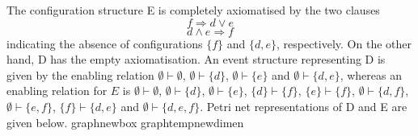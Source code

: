 \documentclass[twocolumn]{article}
\newcommand{\turn}{\vdash}                              \newcommand{\dbigcup}{\bigcup_{\uparrow}}		\newcommand{\nbigcup}{\bigcup_{\bullet}}		\newcommand{\nbigcap}{\bigcap_{\bullet}}		\newcommand{\bbigcup}{\overline{\bigcup}}		\newcommand{\bbigcap}{\overline{\bigcap}}		\newcommand{\nbbigcap}{\bbigcap_{\bullet}}		\newcommand{\fbbigcup}{\overline{\bigcup}^f}		\newcommand{\bbbigcup}{\overline{\bigcup}^2}		\newcommand{\dcup}{~~\makebox[0pt]{\LARGE$\cdot$}\makebox[0pt]{$\cup$}~~}
\begin{document}
The configuration structure E is completely axiomatised by the two
clauses $$f \Rightarrow d\vee e$$ \vspace{-2em} $$d\wedge e \Rightarrow f$$
indicating the absence of configurations $\{f\}$ and $\{d,e\}$, respectively.
On the other hand, D has the empty axiomatisation.
An event structure representing D is given by the enabling relation
$\emptyset \turn \emptyset$, $\emptyset \turn \{d\}$,
$\emptyset \turn \{e\}$ and $\emptyset \turn \{d,e\}$, whereas
an enabling relation
for $E$ is $\emptyset \turn \emptyset$, $\emptyset \turn \{d\}$,
$\emptyset \turn \{e\}$, $\{d\} \turn \{f\}$, $\{e\} \turn \{f\}$,
$\emptyset \turn \{d,f\}$, $\emptyset \turn \{e,f\}$,
$\{f\} \turn \{d,e\}$ and $\emptyset \turn \{d,e,f\}$.
Petri net representations of D and E are given below.
\expandafter\ifx\csname graph\endcsname\relax \csname newbox\endcsname\graph\fi
\expandafter\ifx\csname graphtemp\endcsname\relax \csname newdimen\endcsname\graphtemp\fi
\end{document}
